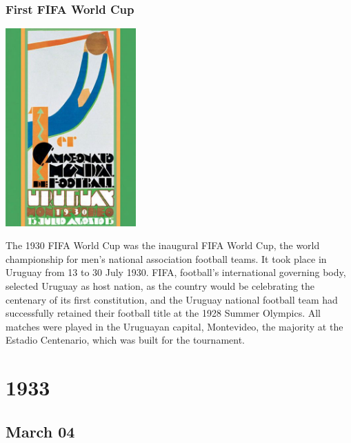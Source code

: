 \documentclass[11pt]{report}
\begin{document}
\subsection{First FIFA World Cup}
\vspace{2mm}\begin{center}\includegraphics[width=5cm]{./img/fifa1930.jpg}\end{center}
The 1930 FIFA World Cup was the inaugural FIFA World Cup, the world championship for men's national association football teams. It took place in Uruguay from 13 to 30 July 1930. FIFA, football's international governing body, selected Uruguay as host nation, as the country would be celebrating the centenary of its first constitution, and the Uruguay national football team had successfully retained their football title at the 1928 Summer Olympics. All matches were played in the Uruguayan capital, Montevideo, the majority at the Estadio Centenario, which was built for the tournament.

\chapter{1933}
\section{March 04}
\end{document}
